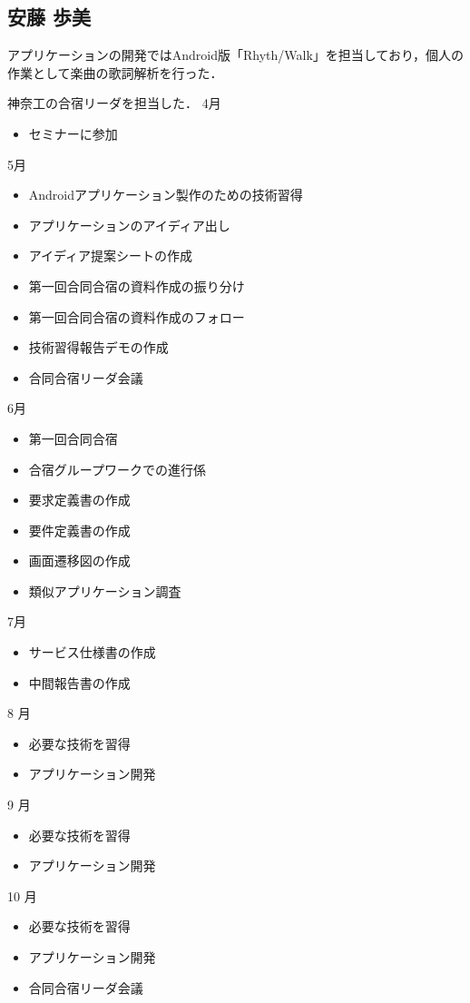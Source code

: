 \subsection{安藤 歩美}
\par アプリケーションの開発ではAndroid版「Rhyth/Walk」を担当しており，個人の作業として楽曲の歌詞解析を行った．
\par 神奈工の合宿リーダを担当した．
4月
\begin{itemize}
\item セミナーに参加
\end{itemize}
5月
\begin{itemize}
\item Androidアプリケーション製作のための技術習得
\item アプリケーションのアイディア出し
\item アイディア提案シートの作成
\item 第一回合同合宿の資料作成の振り分け
\item 第一回合同合宿の資料作成のフォロー
\item 技術習得報告デモの作成
\item 合同合宿リーダ会議
\end{itemize}
6月
\begin{itemize}
\item 第一回合同合宿
\item 合宿グループワークでの進行係
\item 要求定義書の作成
\item 要件定義書の作成
\item 画面遷移図の作成
\item 類似アプリケーション調査
\end{itemize}
7月
\begin{itemize}
\item サービス仕様書の作成
\item 中間報告書の作成
\end{itemize}
8 月
\begin{itemize}
\item 必要な技術を習得
\item アプリケーション開発
\end{itemize}
9 月
\begin{itemize}
\item 必要な技術を習得
\item アプリケーション開発
\end{itemize}
10 月
\begin{itemize}
\item 必要な技術を習得
\item アプリケーション開発
\item 合同合宿リーダ会議
\end{itemize}

